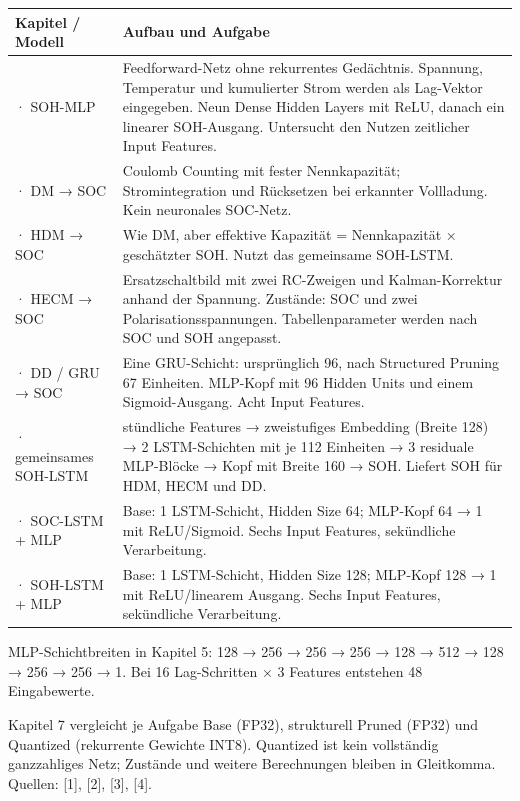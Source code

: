 \documentclass[11pt,a4paper]{article}
\begin{document}
{\fontsize{9.5}{12}\selectfont\setlength{\tabcolsep}{2mm}\renewcommand{\arraystretch}{1.2}\begin{longtable}{>{\raggedright\arraybackslash}p{35.47mm}>{\raggedright\arraybackslash}p{126.53mm}}
\toprule
\textbf{Kapitel /\allowbreak{} Modell} & \textbf{Aufbau und Aufgabe} \\
\midrule\endhead
5 · SOH-MLP & Feedforward-Netz ohne rekurrentes Gedächtnis. Spannung, Temperatur und kumulierter Strom werden als Lag-Vektor eingegeben. Neun Dense Hidden Layers mit ReLU, danach ein linearer SOH-Ausgang. Untersucht den Nutzen zeitlicher Input Features. \\
6 · DM → SOC & Coulomb Counting mit fester Nennkapazität; Stromintegration und Rücksetzen bei erkannter Vollladung. Kein neuronales SOC-Netz. \\
6 · HDM → SOC & Wie DM, aber effektive Kapazität = Nennkapazität × geschätzter SOH. Nutzt das gemeinsame SOH-LSTM. \\
6 · HECM → SOC & Ersatzschaltbild mit zwei RC-Zweigen und Kalman-Korrektur anhand der Spannung. Zustände: SOC und zwei Polarisationsspannungen. Tabellenparameter werden nach SOC und SOH angepasst. \\
6 · DD /\allowbreak{} GRU → SOC & Eine GRU-Schicht: ursprünglich 96, nach Structured Pruning 67 Einheiten. MLP-Kopf mit 96 Hidden Units und einem Sigmoid-Ausgang. Acht Input Features. \\
6 · gemeinsames SOH-LSTM & 20 stündliche Features → zweistufiges Embedding (Breite 128) → 2 LSTM-Schichten mit je 112 Einheiten → 3 residuale MLP-Blöcke → Kopf mit Breite 160 → SOH. Liefert SOH für HDM, HECM und DD. \\
7 · SOC-LSTM + MLP & Base: 1 LSTM-Schicht, Hidden Size 64; MLP-Kopf 64 → 1 mit ReLU/\allowbreak{}Sigmoid. Sechs Input Features, sekündliche Verarbeitung. \\
7 · SOH-LSTM + MLP & Base: 1 LSTM-Schicht, Hidden Size 128; MLP-Kopf 128 → 1 mit ReLU/\allowbreak{}linearem Ausgang. Sechs Input Features, sekündliche Verarbeitung. \\
\bottomrule
\end{longtable}}
MLP-Schichtbreiten in Kapitel 5: 128 → 256 → 256 → 256 → 128 → 512 → 128 → 256 → 256 → 1. Bei 16 Lag-Schritten × 3 Features entstehen 48 Eingabewerte.

Kapitel 7 vergleicht je Aufgabe Base (FP32), strukturell Pruned (FP32) und Quantized (rekurrente Gewichte INT8). Quantized ist kein vollständig ganzzahliges Netz; Zustände und weitere Berechnungen bleiben in Gleitkomma. Quellen: [1], [2], [3], [4].
\end{document}
